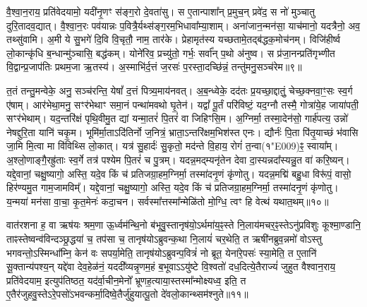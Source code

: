 वै॒श्वा॒न॒राय॒ प्रति॑वेदयामो॒ यदी॑नृ॒णꣳ स॑ङ्ग॒रो दे॒वता॑सु। 
स ए॒तान्पाशा᳚न् प्र॒मुच॒न् प्रवे॑द॒ स नो॑ मुञ्चातु दुरि॒तादव॒द्यात्। 
वै॒श्वा॒न॒रः पव॑यान्नः प॒वित्रै॒र्यथ्स॑ङ्ग॒रम॒भिधावा᳚म्या॒शाम्। 
अना॑जान॒न्मन॑सा॒ याच॑मानो॒ यदत्रैनो॒ अव॒ तथ्सु॑वामि। 
अ॒मी ये सु॒भगे॑ दि॒वि वि॒चृतौ॒ नाम॒ तार॑के। 
प्रेहामृत॑स्य यच्छतामे॒तद्ब॑द्धक॒मोच॑नम्। 
विजि॑हीर्ष्व लो॒कान्कृ॑धि ब॒न्धान्मु॑ञ्चासि॒ बद्ध॑कम्। 
योने॑रिव॒ प्रच्यु॑तो॒ गर्भः॒ सर्वा᳚न् प॒थो अ॑नुष्व। 
स प्र॑जा॒नन्प्रति॑गृभ्णीत वि॒द्वान्प्र॒जाप॑तिः प्रथम॒जा ऋ॒तस्य॑। 
अ॒स्माभि॑र्द॒त्तं ज॒रसः॑ प॒रस्ता॒दच्छि॑न्नं॒ तन्तु॑मनु॒सञ्च॑रेम॥९॥

त॒तं तन्तु॒मन्वेके॒ अनु॒ सञ्च॑रन्ति॒ येषां᳚ द॒त्तं पित्र्य॒माय॑नवत्। 
अ॒ब॒न्ध्वेके॒ दद॑तः प्र॒यच्छा॒द्दातुं॒ चेच्छ॒क्नवा॒ꣳ॒सः स्व॒र्ग ए॑षाम्। 
आर॑भेथा॒मनु॒ सꣳर॑भेथाꣳ समा॒नं पन्था॑मवथो घृ॒तेन॑। 
यद्वां᳚ पू॒र्तं परि॑विष्टं॒ यद॒ग्नौ तस्मै॒ गोत्रा॑ये॒ह जाया॑पती॒ सꣳर॑भेथाम्। 
यद॒न्तरि॑क्षं पृथि॒वीमु॒त द्यां यन्मा॒तरं॑ पि॒तरं॑ वा जिहिꣳसि॒म। 
अ॒ग्निर्मा॒ तस्मा॒देन॑सो॒ गार्\mbox{}ह॑पत्य॒ उन्नो॑ नेषद्दुरि॒ता यानि॑ चकृ॒म। 
भूमि॑र्मा॒ताऽदि॑तिर्नो ज॒नित्रं॒ भ्राता॒ऽन्तरि॑क्षम॒भिश॑स्त एनः। 
द्यौर्नः॑ पि॒ता पि॑तृ॒याच्छं भ॑वासि जा॒मि मि॒त्वा मा वि॑विथ्सि लो॒कात्। 
यत्र॑ सु॒हार्दः॑ सु॒कृतो॒ मद॑न्ते वि॒हाय॒ रोगं॑ त॒न्वा(१\char"E009)ꣴ॒ स्वाया᳚म्। 
अ॒श्लो॒णाङ्गै॒रह्रु॑ताः स्व॒र्गे तत्र॑ पश्येम पि॒तरं॑ च पु॒त्रम्। 
यदन्न॒मद्म्यनृ॑तेन देवा दा॒स्यन्नदा᳚स्यन्नु॒त वा॑ करि॒ष्यन्। 
यद्दे॒वानां॒ चक्षु॒ष्यागो॒ अस्ति॒ यदे॒व किं च॑ प्रतिजग्रा॒हम॒ग्निर्मा॒ तस्मा॑दनृ॒णं कृ॑णोतु। 
यदन्न॒मद्मि॑ बहु॒धा विरू॑पं॒ वासो॒ हिर॑ण्यमु॒त गाम॒जामविम्᳚। 
यद्दे॒वानां॒ चक्षु॒ष्यागो॒ अस्ति॒ यदे॒व किं च॑ प्रतिजग्रा॒हम॒ग्निर्मा॒ तस्मा॑दनृ॒णं कृ॑णोतु। 
य॒न्मया॑ मन॑सा वा॒चा॒ कृ॒त॒मेनः॑ कदा॒चन। 
सर्वस्मा᳚त्तस्मा᳚न्मेळि॑तो मो॒ग्धि॒ त्वꣳ हि वेत्थ॑ यथात॒थम्॥१०॥\anuvakamend

वात॑रशना ह॒ वा ऋष॑यः श्रम॒णा ऊ॒र्ध्वम॑न्थि॒नो ब॑भूवु॒स्तानृष॑यो॒\-ऽर्थमा॑य॒ꣴ॒स्ते नि॒लाय॑मचर॒ꣴ॒स्तेऽनु॑प्रविशुः कूश्मा॒ण्डानि॒ ताꣴस्तेष्वन्व॑विन्दञ्छ्र॒द्धया॑ च॒ तप॑सा च॒ तानृष॑योऽब्रुवन्क॒था नि॒लायं॑ चर॒थेति॒ त ऋषी॑नब्रुव॒न्नमो॑ वोऽस्तु भगवन्तो॒ऽस्मिन्धा᳚म्नि॒ केन॑ वः सपर्या॒मेति॒ तानृष॑योऽब्रुवन्प॒वित्रं॑ नो ब्रूत॒ येना॑रे॒पसः॑ स्या॒मेति॒ त ए॒तानि॑ सू॒क्तान्य॑पश्य॒न् यद्दे॑वा देव॒हेळ॑नं॒ यददी᳚व्यन्नृ॒णम॒हं ब॒भूवाऽऽयु॑ष्टे वि॒श्वतो॑ दध॒दित्ये॒तैराज्यं॑ जुहुत वैश्वान॒राय॒ प्रति॑वेदयाम॒ इत्युप॑तिष्ठत॒ यद॑र्वा॒चीन॒मेनो᳚ भ्रूणह॒त्याया॒\-स्तस्मा᳚न्मोक्ष्यध्व॒ इति॒ त ए॒तैर॑जुहवु॒स्तेऽरे॒पसो॑\-ऽभवन्कर्मा॒दिष्वे॒तैर्जु॑हुयात्पू॒तो दे॑वलो॒कान्थ्सम॑श्नुते॥११॥\anuvakamend


